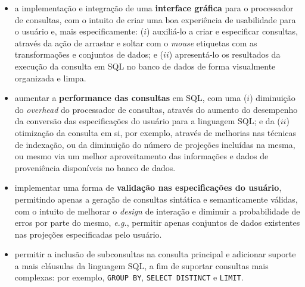 \begin{itemize}
    \item a implementação e integração de uma \textbf{interface gráfica} para o processador de consultas, com o intuito de criar uma boa experiência de usabilidade para o usuário e, mais especificamente: (\(i\)) auxiliá-lo a criar e especificar consultas, através da ação de arrastar e soltar com o \textit{mouse} etiquetas com as transformações e conjuntos de dados; e (\(ii\)) apresentá-lo os resultados da execução da consulta em SQL no banco de dados de forma visualmente organizada e limpa.
    \item aumentar a \textbf{performance das consultas} em SQL, com uma (\(i\)) diminuição do \textit{overhead} do processador de consultas, através do aumento do desempenho da conversão das especificações do usuário para a linguagem SQL; e da (\(ii\)) otimização da consulta em si, por exemplo, através de melhorias nas técnicas de indexação, ou da diminuição do número de projeções incluídas na mesma, ou mesmo via um melhor aproveitamento das informações e dados de proveniência disponíveis no banco de dados.
    \item implementar uma forma de \textbf{validação nas especificações do usuário}, permitindo apenas a geração de consultas sintática e semanticamente válidas, com o intuito de melhorar o \textit{design} de interação e diminuir a probabilidade de erros por parte do mesmo, \textit{e.g.}, permitir apenas conjuntos de dados existentes nas projeções especificadas pelo usuário.
    \item permitir a inclusão de subconsultas na consulta principal e adicionar suporte a mais cláusulas da linguagem SQL, a fim de suportar consultas mais complexas: por exemplo, \texttt{GROUP BY}, \texttt{SELECT DISTINCT} e \texttt{LIMIT}.
\end{itemize}
